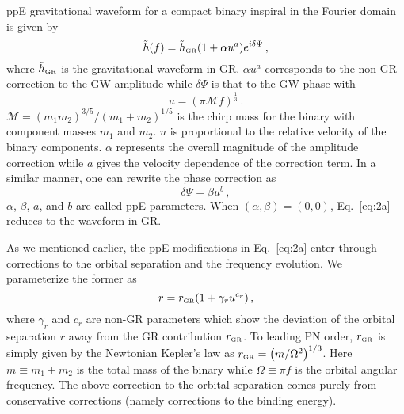 \documentclass[prd,twocolumn,nofootinbib]{revtex4-1}
\newcommand{\GR}{{\mbox{\tiny GR}}}
\begin{document}
ppE gravitational waveform for a compact binary inspiral in the Fourier domain is given by ~\cite{Yunes:2009ke}
\begin{equation}\label{eq:2a}
\tilde{h}(f)=\tilde{h}_{\GR}(1+\alpha u^a)e^{i\delta\Psi}\,,
\end{equation}
% 
where $\tilde{h}_{\GR}$ is the gravitational waveform in GR. $\alpha u^a$ corresponds to the non-GR correction to the GW amplitude while  $\delta \Psi$ is that to the GW phase with 
\begin{equation}
u=(\pi \mathcal{M} f)^\frac{1}{3}\,.
\end{equation}
$\mathcal{M}=(m_1m_2)^{3/5}/(m_1+m_2)^{1/5}$ is the chirp mass for the binary with component masses $m_1$ and $m_2$. $u$ is proportional to the relative velocity of the binary components. $\alpha$ represents the overall magnitude of the amplitude correction while $a$ gives the velocity dependence of the correction term. In a similar manner, one can rewrite the phase correction as 
\begin{equation}\label{eq:2b}
\delta\Psi=\beta u^b\,,
\end{equation}
$\alpha$, $\beta$, $a$, and $b$ are called ppE parameters. When $(\alpha,\beta) = (0,0)$, Eq.~\eqref{eq:2a} reduces to the waveform in GR.


As we mentioned earlier, the ppE modifications in Eq.~\eqref{eq:2a} enter through corrections to the orbital separation and the frequency evolution.
We parameterize the former as
 \begin{equation}
 \label{eq:2k}
 r=r_{\GR}(1+\gamma_r u^{c_r})\,,
 \end{equation}
where $\gamma_r$ and $c_r$ are non-GR parameters which show the deviation of the orbital separation $r$ away from the GR contribution $r_{\GR}$. To leading PN order, $r_{\GR}$ is simply given by the Newtonian Kepler's law as $r_{\GR}=\left(m/\Omega^2\right)^{1/3}$. Here $m\equiv m_1+m_2$ is the total mass of the binary while $\Omega\equiv\pi f $ is the orbital angular frequency. The above correction to the orbital separation comes purely from conservative corrections (namely corrections to the binding energy).
\end{document}
